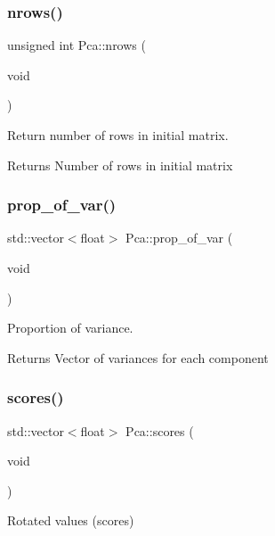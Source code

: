 \subsubsection{\texorpdfstring{nrows()}{nrows()}}
{\footnotesize\ttfamily unsigned int Pca\+::nrows (\begin{DoxyParamCaption}\item[{void}]{ }\end{DoxyParamCaption})}



Return number of rows in initial matrix. 

\begin{DoxyReturn}{Returns}
Number of rows in initial matrix 
\end{DoxyReturn}
\hypertarget{classPca_a70f5508f41d2d61464fe8ce21f48dc89}{}\label{classPca_a70f5508f41d2d61464fe8ce21f48dc89} 
\subsubsection{\texorpdfstring{prop\+\_\+of\+\_\+var()}{prop\_of\_var()}}
{\footnotesize\ttfamily std\+::vector$<$float$>$ Pca\+::prop\+\_\+of\+\_\+var (\begin{DoxyParamCaption}\item[{void}]{ }\end{DoxyParamCaption})}



Proportion of variance. 

\begin{DoxyReturn}{Returns}
Vector of variances for each component 
\end{DoxyReturn}
\hypertarget{classPca_a469f69a53d76c2f7ad26e28e969bd09c}{}\label{classPca_a469f69a53d76c2f7ad26e28e969bd09c} 
\subsubsection{\texorpdfstring{scores()}{scores()}}
{\footnotesize\ttfamily std\+::vector$<$float$>$ Pca\+::scores (\begin{DoxyParamCaption}\item[{void}]{ }\end{DoxyParamCaption})}



Rotated values (scores) 

